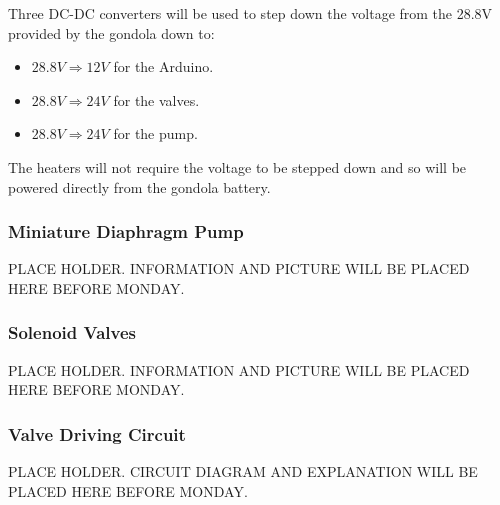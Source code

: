 \begin{centering}
Three DC-DC converters will be used to step down the voltage from the 28.8V provided by the gondola down to: 
\end{centering}

\begin{centering}
\begin{itemize}
  \item $28.8V \Longrightarrow 12V$ for the Arduino.  
  \item $28.8V \Longrightarrow 24V$ for the valves.
  \item $28.8V \Longrightarrow 24V$ for the pump.
  \end{itemize}

\end{centering}
\bigskip

\begin{centering}
The heaters will not require the voltage to be stepped down and so will be powered directly from the gondola battery.
\end{centering}
\bigskip

\subsubsection{Miniature Diaphragm Pump}
PLACE HOLDER. INFORMATION AND PICTURE WILL BE PLACED HERE BEFORE MONDAY.

\subsubsection{Solenoid Valves}
PLACE HOLDER. INFORMATION AND PICTURE WILL BE PLACED HERE BEFORE MONDAY.

\subsubsection{Valve Driving Circuit}
PLACE HOLDER. CIRCUIT DIAGRAM AND EXPLANATION WILL BE PLACED HERE BEFORE MONDAY.

\raggedbottom
